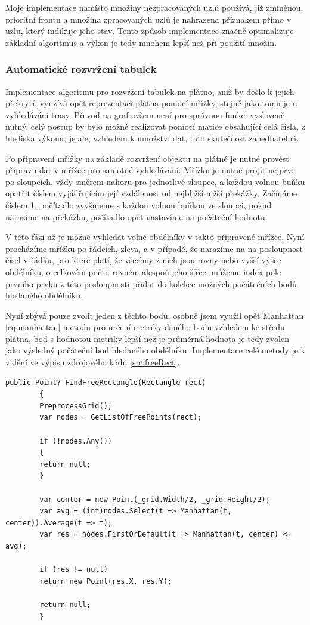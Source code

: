 \documentclass[czech,bachelor,public,dept460,male,oneside]{diploma}
\begin{document}
		Moje implementace namísto množiny nezpracovaných uzlů používá, již zmíněnou, prioritní frontu a množina zpracovaných uzlů je nahrazena příznakem přímo v uzlu, který indikuje jeho stav. Tento způsob implementace značně optimalizuje základní algoritmus a výkon je tedy mnohem lepší než při použití množin.
		
		\subsubsection{Automatické rozvržení tabulek} \label{secTablePos}
		Implementace algoritmu pro rozvržení tabulek na plátno, aniž by došlo k jejich překrytí, využívá opět reprezentaci plátna pomocí mřížky, stejně jako tomu je u vyhledávání trasy. Převod na graf ovšem není pro správnou funkci vysloveně nutný, celý postup by bylo možné realizovat pomocí matice obsahující celá čísla, z hlediska výkonu, je ale, vzhledem k množství dat, tato skutečnost zanedbatelná. 
		
		Po připravení mřížky na základě rozvržení objektu na plátně je nutné provést přípravu dat v mřížce pro samotné vyhledávaní. Mřížku je nutné projít nejprve po sloupcích, vždy směrem nahoru pro jednotlivé sloupce, a každou volnou buňku opatřit číslem vyjádřujícím její vzdálenost od nejbližší nižší překážky. Začínáme číslem 1, počítadlo zvyšujeme s každou volnou buňkou ve sloupci, pokud narazíme na překážku, počítadlo opět nastavíme na počáteční hodnotu. 
		
		V této fázi už je možné vyhledat volné obdélníky v takto připravené mřížce. Nyní procházíme mřížku po řádcích, zleva, a v případě, že narazíme na na posloupnost čísel v řádku, pro které platí, že všechny z nich jsou rovny nebo vyšší výšce obdélníku, o celkovém počtu rovném alespoň jeho šířce, můžeme index pole prvního prvku z této posloupnosti přidat do kolekce možných počátečních bodů hledaného obdélníku.
		
		Nyní zbývá pouze zvolit jeden z těchto bodů, osobně jsem využil opět Manhattan \ref{eq:manhattan} metodu pro určení metriky daného bodu vzhledem ke středu plátna, bod s hodnotou metriky lepší než je průměrná hodnota je tedy zvolen jako výsledný počáteční bod hledaného obdélníku. Implementace celé metody je k vidění ve výpisu zdrojového kódu \ref{src:freeRect}.
		
		\newpage
		\begin{lstlisting}[label=src:freeRect,caption=Nalezení volného obdélníku v mřížce]
		public Point? FindFreeRectangle(Rectangle rect)
		{
		PreprocessGrid();
		var nodes = GetListOfFreePoints(rect);
		
		if (!nodes.Any())
		{
		return null;
		}
		
		var center = new Point(_grid.Width/2, _grid.Height/2);
		var avg = (int)nodes.Select(t => Manhattan(t, center)).Average(t => t);
		var res = nodes.FirstOrDefault(t => Manhattan(t, center) <= avg);
		
		if (res != null) 
		return new Point(res.X, res.Y);
		
		return null;
		}
		\end{lstlisting}
		
\end{document}

